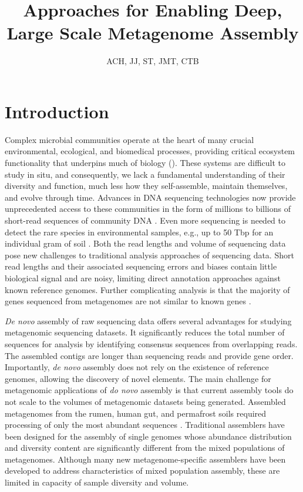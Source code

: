 \documentclass[11pt]{article} %
\begin{document}
\title{Approaches for Enabling Deep, Large Scale Metagenome Assembly}
\author{ACH, JJ, ST, JMT, CTB}
\maketitle

\section{Introduction}  
Complex microbial communities operate at the heart of many crucial environmental, ecological, and biomedical processes, providing critical ecosystem functionality that underpins much of biology (\cite{Arumugam:2011p735,Hess:2011p686,Iverson:2012p1281,Mackelprang:2011p1087,Qin:2010p189,Tringe:2005p174,Venter:2004p170}).  These systems are difficult to study in situ, and consequently, we lack a fundamental understanding of their diversity and function, much less how they self-assemble, maintain themselves, and evolve through time.  Advances in DNA sequencing technologies now provide unprecedented access to these communities in the form of millions to billions of short-read sequences of community DNA  \cite{Hess:2011p686,Mackelprang:2011p1087,Qin:2010p189}.   Even more sequencing is needed to detect the rare species in environmental samples, e.g., up to 50 Tbp for an individual gram of soil \cite{Gans:2005p1365}.   Both the read lengths and volume of sequencing data pose new challenges to traditional analysis approaches of sequencing data.  Short read lengths and their associated sequencing errors and biases contain little biological signal and are noisy, limiting direct annotation approaches against known reference genomes.  Further complicating analysis is that the majority of genes sequenced from metagenomes are not similar to known genes \cite{Arumugam:2011p735,Qin:2010p189}.  

\emph{De novo} assembly of raw sequencing data offers several advantages for studying metagenomic sequencing datasets.  It significantly reduces the total number of sequences for analysis by identifying consensus sequences from overlapping reads.  The assembled contigs are longer than sequencing reads and provide gene order.  Importantly, \emph{de novo} assembly does not rely on the existence of reference genomes, allowing the discovery of novel elements.   The main challenge for metagenomic applications of \emph{do novo} assembly is that current assembly tools do not scale to the volumes of metagenomic datasets being generated. Assembled metagenomes from the rumen, human gut, and permafrost soils required processing of only the most abundant sequences  \cite{Hess:2011p686,Mackelprang:2011p1087,Qin:2010p189}.  Traditional assemblers have been designed for the assembly of single genomes whose abundance distribution and diversity content are significantly different from the mixed populations of metagenomes.  Although many new metagenome-specific assemblers have been developed to address characteristics of mixed population assembly, these are limited in capacity of sample diversity and volume.    
\end{document}
